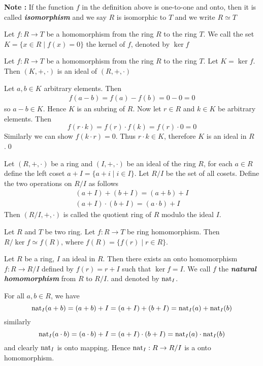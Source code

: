 \noindent
\textbf{Note :} If the function \(f\) in the definition above is one-to-one and onto, then it is called \textbf{\textit{isomorphism}} and we say \(R\) is isomorphic to \(T\) and we write \(R\simeq T\)


\begin{mydef}
    Let \(f:R\to T\) be a homomorphism from the ring \(R\) to the ring \(T\). We call the set \(K=\{x\in R\mid f(x)=0\}\) the kernel of \(f\), denoted by \(\ker{f}\)
\end{mydef}

\begin{theo}
    Let \(f:R\to T\) be a homomorphism from the ring \(R\) to the ring \(T\). Let \(K=\ker{f}\). Then \((K,+,\cdot)\) is an ideal of \((R,+,\cdot)\)
\end{theo}
\begin{myproof}
    Let \(a,b\in K\) arbitrary elements. Then
\begin{align*}
    f(a-b)=f(a)-f(b)=0-0=0
\end{align*}
so \(a-b\in K\). Hence \(K\) is an subring of \(R\). Now let \(r\in R\) and \(k\in K\) be arbitrary elements. Then
\[
f(r\cdot k)=f(r)\cdot f(k)=f(r)\cdot0=0
\]
Similarly we can show \(f(k\cdot r)=0\). Thus \(r\cdot k\in K\), therefore \(K\) is an ideal in \(R\).\qed
\end{myproof}

\begin{mydef}
    Let \((R,+,\cdot)\) be a ring and \((I,+,\cdot)\) be an ideal of the ring \(R\), for each \(a\in R\) define the left coset \(a+I=\{a+i\mid i\in I\}\). Let \(R/I\) be the set of all cosets. Define the two operations on \(R/I\) as follows
    \begin{gather*}
        (a+I)+(b+I)=(a+b)+I\\
        (a+I)\cdot(b+I)=(a\cdot b)+I
    \end{gather*}
    Then \((R/I,+,\cdot)\) is called the quotient ring of \(R\) modulo the ideal \(I\).
\end{mydef}

\begin{theo}
   Let \(R\) and \(T\) be two ring. Let \(f:R\to T\) be ring homomorphism. Then \(R/\ker{f}\simeq f(R)\), where \(f(R)=\{f(r)\mid r\in R\}\).
\end{theo}

\begin{theo}
    Let \(R\) be a ring, \(I\) an ideal in \(R\). Then there exists an onto homomorphism \(f:R\to R/I\) defined by \(f(r)=r+I\) such that \(\ker{f}=I\). We call \(f\) the \textbf{\textit{natural homomorphism}} from \(R\) to \(R/I\). and denoted by \(\operatorname{nat}_I\).
\end{theo}
\begin{myproof}
    For all \(a,b\in R\), we have
\[
\operatorname{nat}_I(a+b)=(a+b)+I=(a+I)+(b+I)=\operatorname{nat}_I(a)+\operatorname{nat}_I(b)
\]
similarly
\[
\operatorname{nat}_I(a\cdot b)=(a\cdot b)+I=(a+I)\cdot(b+I)=\operatorname{nat}_I(a)\cdot\operatorname{nat}_I(b)
\]
and clearly \(\operatorname{nat}_I\) is onto mapping. Hence \(\operatorname{nat}_I:R\to R/I\) is a onto homomorphism.
\end{myproof}

